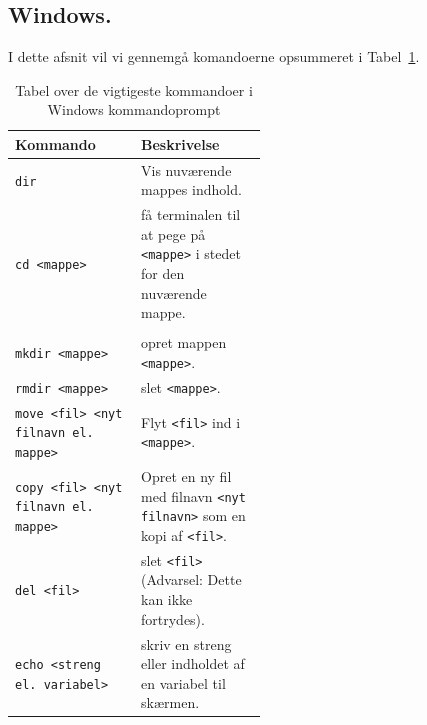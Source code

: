 \documentclass[a4paper]{article}
\begin{document}
\subsection{Windows.}
I dette afsnit vil vi gennemgå komandoerne opsummeret i Tabel~\ref{tab:WindowsKommandoer}.
\begin{table}
  \centering
  \begin{tabular}{|l||p{0.5\linewidth}|}
    \hline
    Kommando & Beskrivelse 
    \\ \hline\hline
    \verb|dir|
             & Vis nuværende mappes indhold. 
    \\ \hline
    \verb|cd <mappe>| 
             & få terminalen til at pege på \verb|<mappe>| i stedet for den nuværende mappe. 
    \\ \hline
    \\ \hline
    \verb|mkdir <mappe>|
             & opret mappen \verb|<mappe>|. \\ \hline
    \verb|rmdir <mappe>|
             & slet \verb|<mappe>|. \\ \hline
    \verb|move <fil> <nyt filnavn el. mappe>|
             & Flyt \verb|<fil>| ind i \verb|<mappe>|. \\ \hline
    \verb|copy <fil> <nyt filnavn el. mappe>|
             & Opret en ny fil med filnavn \verb|<nyt filnavn>| som en kopi af \verb|<fil>|. \\ \hline
    \verb|del <fil>|
             & slet \verb|<fil>| (Advarsel: Dette kan ikke fortrydes). \\ \hline
    \verb|echo <streng el. variabel>|
               & skriv en streng eller indholdet af en variabel til skærmen. \\ \hline
  \end{tabular}\\
  \caption{Tabel over de vigtigeste kommandoer i Windows kommandoprompt}
  \label{tab:WindowsKommandoer}
\end{table}
\end{document}
